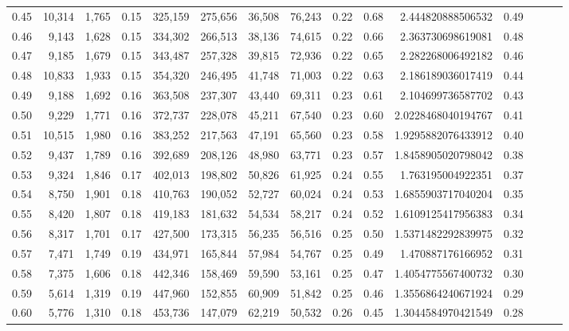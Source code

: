 \begin{tabular}{rrrrrrrrrrrrrrr}
0.45 &  10,314 &  1,765 &  0.15 &  325,159 &  275,656 &   36,508 &   76,243 &  0.22 &  0.68 &     2.444820888506532 &      0.49 \\
0.46 &   9,143 &  1,628 &  0.15 &  334,302 &  266,513 &   38,136 &   74,615 &  0.22 &  0.66 &     2.363730698619081 &      0.48 \\
0.47 &   9,185 &  1,679 &  0.15 &  343,487 &  257,328 &   39,815 &   72,936 &  0.22 &  0.65 &     2.282268006492182 &      0.46 \\
0.48 &  10,833 &  1,933 &  0.15 &  354,320 &  246,495 &   41,748 &   71,003 &  0.22 &  0.63 &     2.186189036017419 &      0.44 \\
0.49 &   9,188 &  1,692 &  0.16 &  363,508 &  237,307 &   43,440 &   69,311 &  0.23 &  0.61 &     2.104699736587702 &      0.43 \\
0.50 &   9,229 &  1,771 &  0.16 &  372,737 &  228,078 &   45,211 &   67,540 &  0.23 &  0.60 &    2.0228468040194767 &      0.41 \\
0.51 &  10,515 &  1,980 &  0.16 &  383,252 &  217,563 &   47,191 &   65,560 &  0.23 &  0.58 &    1.9295882076433912 &      0.40 \\
0.52 &   9,437 &  1,789 &  0.16 &  392,689 &  208,126 &   48,980 &   63,771 &  0.23 &  0.57 &    1.8458905020798042 &      0.38 \\
0.53 &   9,324 &  1,846 &  0.17 &  402,013 &  198,802 &   50,826 &   61,925 &  0.24 &  0.55 &     1.763195004922351 &      0.37 \\
0.54 &   8,750 &  1,901 &  0.18 &  410,763 &  190,052 &   52,727 &   60,024 &  0.24 &  0.53 &    1.6855903717040204 &      0.35 \\
0.55 &   8,420 &  1,807 &  0.18 &  419,183 &  181,632 &   54,534 &   58,217 &  0.24 &  0.52 &    1.6109125417956383 &      0.34 \\
0.56 &   8,317 &  1,701 &  0.17 &  427,500 &  173,315 &   56,235 &   56,516 &  0.25 &  0.50 &    1.5371482292839975 &      0.32 \\
0.57 &   7,471 &  1,749 &  0.19 &  434,971 &  165,844 &   57,984 &   54,767 &  0.25 &  0.49 &     1.470887176166952 &      0.31 \\
0.58 &   7,375 &  1,606 &  0.18 &  442,346 &  158,469 &   59,590 &   53,161 &  0.25 &  0.47 &    1.4054775567400732 &      0.30 \\
0.59 &   5,614 &  1,319 &  0.19 &  447,960 &  152,855 &   60,909 &   51,842 &  0.25 &  0.46 &    1.3556864240671924 &      0.29 \\
0.60 &   5,776 &  1,310 &  0.18 &  453,736 &  147,079 &   62,219 &   50,532 &  0.26 &  0.45 &    1.3044584970421549 &      0.28 \\

\end{tabular}
